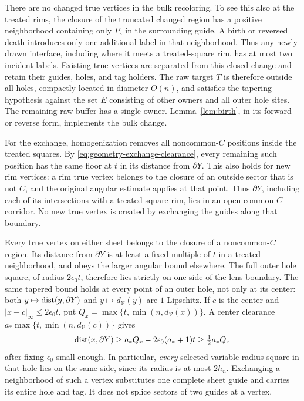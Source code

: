 There are no changed true vertices in the bulk recoloring.  To see
this also at the treated rims, the closure of the truncated changed
region has a positive neighborhood containing only $P_\circ$ in the
surrounding guide.  A birth or reversed death introduces only one
additional label in that neighborhood.  Thus any newly drawn
interface, including where it meets a treated-square rim, has at most
two incident labels.  Existing true vertices are separated from this
closed change and retain their guides, holes, and tag holders.  The
raw target $T$ is therefore outside all holes, compactly located in
diameter $O(n)$, and satisfies the tapering hypothesis against the set
$E$ consisting of other owners and all outer hole sites.  The remaining
raw buffer has a single owner.  Lemma~\ref{lem:birth}, in its forward
or reverse form, implements the bulk change.

For the exchange, homogenization removes all noncommon-$C$ positions
inside the treated squares.  By
\eqref{eq:geometry-exchange-clearance}, every remaining such position
has the same floor at $t$ in its distance from $\partial Y$.  This
also holds for new rim vertices: a rim true vertex belongs to the
closure of an outside sector that is not $C$, and the original angular
estimate applies at that point.  Thus $\partial Y$, including each of
its intersections with a treated-square rim, lies in an open
common-$C$ corridor.  No new true vertex is created by exchanging
the guides along that boundary.

Every true vertex on either sheet belongs to the closure of a
noncommon-$C$ region.  Its distance from $\partial Y$ is at least a
fixed multiple of $t$ in a treated neighborhood, and obeys the larger
angular bound elsewhere.  The full outer hole square, of radius
$2\epsilon_0t$, therefore lies strictly on one side of the lens
boundary.  The same tapered bound holds at every point of an outer hole, not only
at its center: both $y\mapsto\operatorname{dist}(y,\partial Y)$ and
$y\mapsto d_{\mathcal V}(y)$ are $1$-Lipschitz. If $c$ is the center
and $|x-c|_\infty\le2\epsilon_0t$, put
$Q_x=\max\{t,\min(n,d_{\mathcal V}(x))\}$. A center clearance
$a_*\max\{t,\min(n,d_{\mathcal V}(c))\}$ gives
\[
 \operatorname{dist}(x,\partial Y)\ge a_*Q_x-2\epsilon_0(a_*+1)t
                   \ge \tfrac12a_*Q_x
\]
after fixing $\epsilon_0$ small enough. In particular, \emph{every}
selected variable-radius square in that hole lies on the same side,
since its radius is at most $2h_n$.  Exchanging a neighborhood of such a vertex substitutes one
complete sheet guide and carries its entire hole and tag.  It does
not splice sectors of two guides at a vertex.

